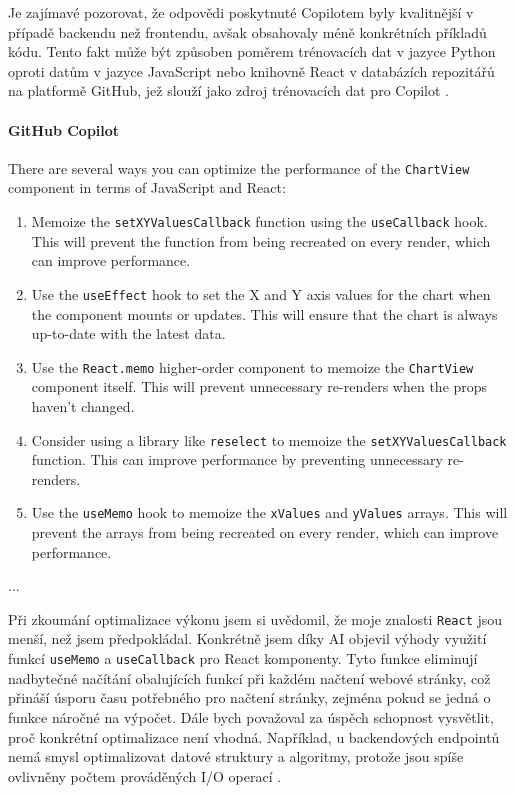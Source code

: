\documentclass[FM,DP]{tulthesis}
\begin{document}
		Je zajímavé pozorovat, že odpovědi poskytnuté Copilotem byly kvalitnější v případě backendu než frontendu, avšak obsahovaly méně konkrétních příkladů kódu. Tento fakt může být způsoben poměrem trénovacích dat v jazyce Python oproti datům v jazyce JavaScript nebo knihovně React v databázích repozitářů na platformě GitHub, jež slouží jako zdroj trénovacích dat pro Copilot \cite{gitCopilot}.
		
		\vspace{0.6em}
		\begin{tcolorbox}[colback=white,colframe=black]
			\paragraph{GitHub Copilot}
			There are several ways you can optimize the performance of the \verb|ChartView| component in terms of JavaScript and React:
			\begin{enumerate}
				\item Memoize the \verb|setXYValuesCallback| function using the \verb|useCallback| hook. This will prevent the function from being recreated on every render, which can improve performance.
				\item Use the \verb|useEffect| hook to set the X and Y axis values for the chart when the component mounts or updates. This will ensure that the chart is always up-to-date with the latest data.
				\item Use the \verb|React.memo| higher-order component to memoize the \verb|ChartView| component itself. This will prevent unnecessary re-renders when the props haven't changed.
				\item Consider using a library like \verb|reselect| to memoize the \verb|setXYValuesCallback| function. This can improve performance by preventing unnecessary re-renders.
				\item Use the \verb|useMemo| hook to memoize the \verb|xValues| and \verb|yValues| arrays. This will prevent the arrays from being recreated on every render, which can improve performance.
			\end{enumerate}
			... \cite{refactoring_simple}
		\end{tcolorbox}
		
		Při zkoumání optimalizace výkonu jsem si uvědomil, že moje znalosti \verb|React| jsou menší, než jsem předpokládal. Konkrétně jsem díky AI objevil výhody využití funkcí \verb|useMemo| a \verb|useCallback| pro React komponenty. Tyto funkce eliminují nadbytečné načítání obalujících funkcí při každém načtení webové stránky, což přináší úsporu času potřebného pro načtení stránky, zejména pokud se jedná o funkce náročné na výpočet. Dále bych považoval za úspěch schopnost vysvětlit, proč konkrétní optimalizace není vhodná. Například, u backendových endpointů nemá smysl optimalizovat datové struktury a algoritmy, protože jsou spíše ovlivněny počtem prováděných I/O operací \cite{react} \cite{bottlenecks}.
		
\end{document}
